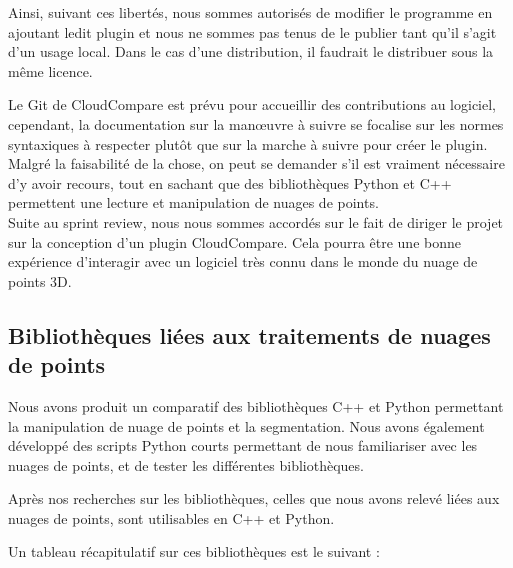 \documentclass[12pt,titlepage,french]{article}
\begin{document}
Ainsi, suivant ces libertés, nous sommes autorisés de modifier le programme en ajoutant ledit plugin et nous ne sommes pas tenus de le publier tant qu'il s'agit d'un usage local. Dans le cas d'une distribution, il faudrait le distribuer sous la même licence.

Le Git de CloudCompare est prévu pour accueillir des contributions au logiciel, cependant, la documentation sur la manœuvre à suivre se focalise sur les normes syntaxiques à respecter plutôt que sur la marche à suivre pour créer le plugin.
Malgré la faisabilité de la chose, on peut se demander s'il est vraiment nécessaire d'y avoir recours, tout en sachant que des bibliothèques Python et C++ permettent une lecture et manipulation de nuages de points.\\
Suite au sprint review, nous nous sommes accordés sur le fait de diriger le projet sur la conception d'un plugin CloudCompare. Cela pourra être une bonne expérience d'interagir avec un logiciel très connu dans le monde du nuage de points 3D.

\subsection{Bibliothèques liées aux traitements de nuages de points}

Nous avons produit un comparatif des bibliothèques C++ et Python permettant la manipulation de nuage de points et la segmentation.
Nous avons également développé des scripts Python courts permettant de nous familiariser avec les nuages de points, et de tester les différentes bibliothèques.

Après nos recherches sur les bibliothèques, celles que nous avons relevé liées aux nuages de points, sont utilisables en C++ et Python.

Un tableau récapitulatif sur ces bibliothèques est le suivant : \\
\end{document}
